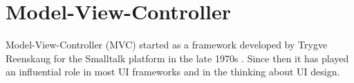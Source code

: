

%
%
%
%

\section{Model-View-Controller}
Model-View-Controller (MVC) started as a framework developed by Trygve Reenskaug for the Smalltalk platform in the late 1970s \cite{Fowler:2002:PEA:579257}. Since then it has played an influential role in most UI frameworks and in the thinking about UI design.

